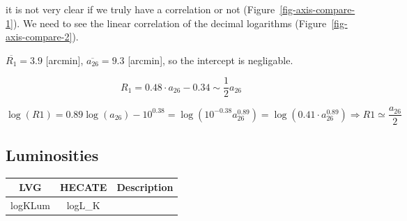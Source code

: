 \documentclass[
]{article}
\begin{document}
it is not very clear if we truly have a correlation or not
(Figure~\ref{fig-axis-compare-1}). We need to see the linear correlation
of the decimal logarithms (Figure~\ref{fig-axis-compare-2}).

\(\overline{R_1} = 3.9\) {[}arcmin{]}, \(\overline{a_{26}} = 9.3\)
{[}arcmin{]}, so the intercept is negligable.

\[
R_1 = 0.48\cdot a_{26}-0.34 \sim \frac{1}{2}a_{26}
\]

\[
\log(R1) = 0.89\log(a_{26})-10^{0.38} = \log(10^{-0.38}a_{26}^{0.89}) = \log(0.41\cdot a_{26}^{0.89})\Rightarrow R1\simeq \frac{a_{26}}{2}
\]

\newpage{}

\subsection{Luminosities}\label{luminosities}

\begin{longtable}[]{@{}ccc@{}}
\toprule\noalign{}
LVG & HECATE & Description \\
\midrule\noalign{}
\endhead
\bottomrule\noalign{}
\endlastfoot
logKLum & logL\_K & \\
\end{longtable}
\end{document}
